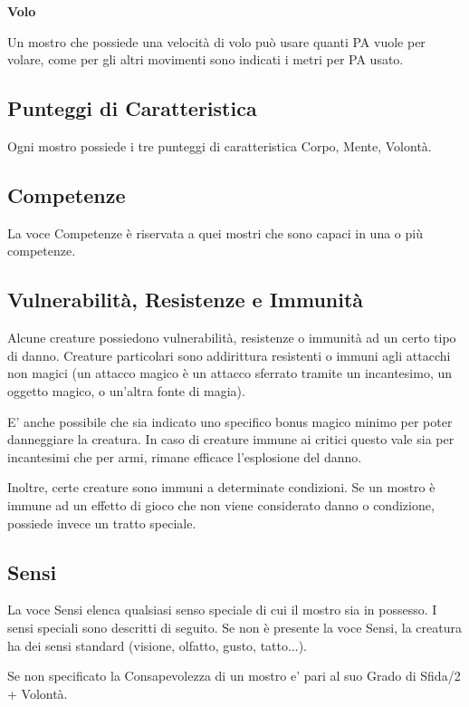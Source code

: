 \documentclass[12pt,a4paper,twoside,openany]{book}
\begin{document}
\begin{multicols}{2}
\smallskip\textbf{Volo}

Un mostro che possiede una velocità di volo può usare quanti PA vuole per volare, come per gli altri movimenti sono indicati i metri per PA usato.

\subsection{Punteggi di Caratteristica}

Ogni mostro possiede i tre punteggi di caratteristica Corpo, Mente, Volontà.

\subsection{Competenze}

La voce Competenze è riservata a quei mostri che sono capaci in una o più competenze.


\subsection{Vulnerabilità, Resistenze e Immunità}
Alcune creature possiedono vulnerabilità, resistenze o immunità ad un certo tipo di danno. Creature particolari sono addirittura resistenti o immuni agli attacchi non magici (un attacco magico è un attacco sferrato tramite un incantesimo, un oggetto magico, o un'altra fonte di magia).

E' anche possibile che sia indicato uno specifico bonus magico minimo per poter danneggiare la creatura. In caso di creature immune ai critici questo vale sia per incantesimi che per armi, rimane efficace l'esplosione del danno. 

Inoltre, certe creature sono immuni a determinate condizioni. Se un mostro è immune ad un effetto di gioco che non viene considerato danno o condizione, possiede invece un tratto speciale.


\subsection{Sensi}

La voce Sensi elenca qualsiasi senso speciale di cui il mostro sia in possesso. I sensi speciali sono descritti di seguito. Se non è presente la voce Sensi, la creatura ha dei sensi standard (visione, olfatto, gusto, tatto...).

Se non specificato la Consapevolezza di un mostro e' pari al suo Grado di Sfida/2 + Volontà.


\end{multicols}
\end{document}
